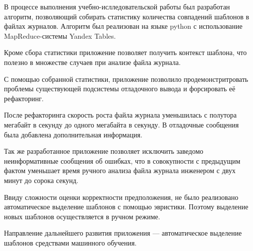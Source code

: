 В процессе выполнения учебно-ислледовательской работы был разработан
алгоритм, позволяющий собирать статистику количества совпадений шаблонов
в файлах журналов.
Алгоритм был реализован на языке python с использование MapReduce-системы
Yandex Tables.

Кроме сбора статистики приложение позволяет получить контекст шаблона,
что полезно в множестве случаев при анализе файла журнала.

С помощью собранной статистики, приложение позволило продемонстритровать
проблемы существующей подсистемы отладочного вывода и форсировать её
рефакторинг.

После рефакторинга скорость роста файла журнала уменьшилась с полутора мегабайт
в секунду до одного мегабайта в секунду. В отладочные сообщения была добавлена
дополнительная информация.

Так же разработанное приложение позволяет исключить заведомо неинформативные
сообщения об ошибках, что в совокупности с предыдущим фактом уменьшает время
ручного анализа файла журнала инженером с двух минут до сорока секунд.

Ввиду сложности оценки корректности предположения, не было реализовано
автоматическое выделение шаблонов с помощью эвристики. Поэтому выделение новых
шаблонов осуществляется в ручном режиме.

Направление дальнейшего развития приложения --- автоматическое выделение
шаблонов средствами машинного обучения.
